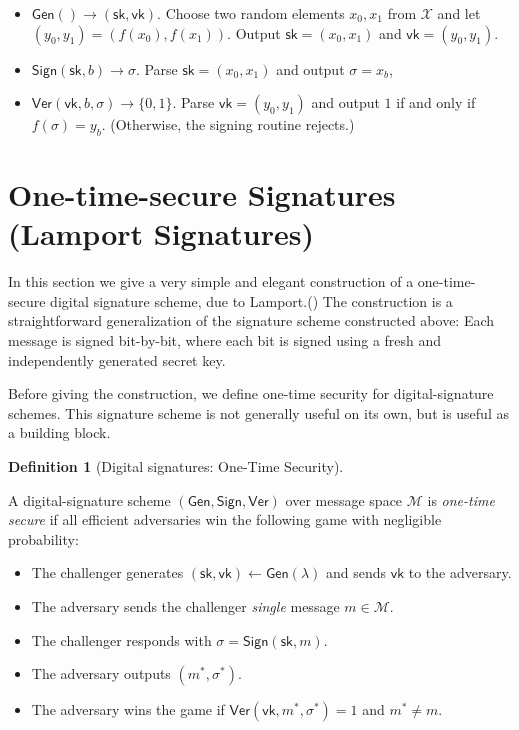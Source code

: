 \documentclass[
  letterpaper,
]{scrbook}
\providecommand{\tightlist}{%
  \setlength{\itemsep}{0pt}\setlength{\parskip}{0pt}}
\newcommand{\zo}{\{0,1\}}
\newcommand{\calM}{\mathcal{M}}
\newcommand{\calX}{\mathcal{X}}
\newcommand{\Gen}{\mathsf{Gen}}
\newcommand{\Sign}{\mathsf{Sign}}
\newcommand{\Ver}{\mathsf{Ver}}
\newcommand{\sk}{\mathsf{sk}}
\newcommand{\vk}{\mathsf{vk}}
\newcommand{\sig}{\sigma}
\theoremstyle{definition}
\newtheorem{definition}{Definition}[chapter]
\theoremstyle{plain}
\theoremstyle{plain}
\theoremstyle{remark}
\begin{document}
\begin{itemize}
\tightlist
\item
  \(\Gen() \to (\sk, \vk)\). Choose two random elements \(x_0, x_1\)
  from \(\calX\) and let \((y_0,y_1)=(f(x_0),f(x_1))\). Output
  \(\sk=(x_0,x_1)\) and \(\vk=(y_0,y_1)\).
\item
  \(\Sign(\sk, b) \to \sigma\). Parse \(\sk=(x_0,x_1)\) and output
  \(\sigma=x_b\),
\item
  \(\Ver(\vk, b, \sig) \to \zo\). Parse \(\vk=(y_0,y_1)\) and output
  \(1\) if and only if \(f(\sig)=y_b\). (Otherwise, the signing routine
  rejects.)
\end{itemize}

\section{One-time-secure Signatures (Lamport
Signatures)}\label{sec-lamport}

In this section we give a very simple and elegant construction of a
one-time-secure digital signature scheme, due to
Lamport.() The construction is a
straightforward generalization of the signature scheme constructed
above: Each message is signed bit-by-bit, where each bit is signed using
a fresh and independently generated secret key.

Before giving the construction, we define one-time security for
digital-signature schemes. This signature scheme is not generally useful
on its own, but is useful as a building block.

\begin{definition}[Digital signatures: One-Time
Security]\protect\hypertarget{def-sig-once}{}\label{def-sig-once}

A digital-signature scheme \((\Gen, \Sign, \Ver)\) over message space
\(\calM\) is \emph{one-time secure} if all efficient adversaries win the
following game with negligible probability:

\begin{itemize}
\tightlist
\item
  The challenger generates \((\sk, \vk) \leftarrow \Gen(\lambda)\) and
  sends \(\vk\) to the adversary.
\item
  The adversary sends the challenger \emph{single} message
  \(m \in \calM\).
\item
  The challenger responds with \(\sig = \Sign(\sk, m)\).
\item
  The adversary outputs \((m^*, \sig^*)\).
\item
  The adversary wins the game if \(\Ver(\vk, m^*, \sig^*) = 1\) and
  \(m^* \neq m\).
\end{itemize}

\end{definition}
\end{document}
